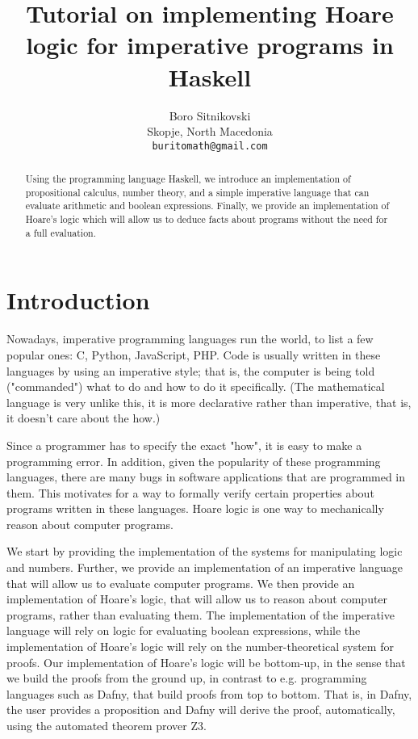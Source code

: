 \documentclass{article}
\title{Tutorial on implementing Hoare logic for imperative programs in Haskell}
\author{
  Boro Sitnikovski \\
  Skopje, North Macedonia \\
  \texttt{buritomath@gmail.com} \\
}
\begin{document}
\maketitle

\begin{abstract}
Using the programming language Haskell, we introduce an implementation of propositional calculus, number theory, and a simple imperative language that can evaluate arithmetic and boolean expressions. Finally, we provide an implementation of Hoare's logic which will allow us to deduce facts about programs without the need for a full evaluation.
\end{abstract}


\section{Introduction}

Nowadays, imperative programming languages run the world, to list a few popular ones: C, Python, JavaScript, PHP. Code is usually written in these languages by using an imperative style; that is, the computer is being told ("commanded") what to do and how to do it specifically. (The mathematical language is very unlike this, it is more declarative rather than imperative, that is, it doesn't care about the how.)

Since a programmer has to specify the exact "how", it is easy to make a programming error. In addition, given the popularity of these programming languages, there are many bugs in software applications that are programmed in them. This motivates for a way to formally verify certain properties about programs written in these languages. Hoare logic is one way to mechanically reason about computer programs.

We start by providing the implementation of the systems for manipulating logic and numbers. Further, we provide an implementation of an imperative language that will allow us to evaluate computer programs. We then provide an implementation of Hoare's logic, that will allow us to reason about computer programs, rather than evaluating them. The implementation of the imperative language will rely on logic for evaluating boolean expressions, while the implementation of Hoare's logic will rely on the number-theoretical system for proofs. Our implementation of Hoare's logic will be bottom-up, in the sense that we build the proofs from the ground up, in contrast to e.g. programming languages such as Dafny\cite{b1}, that build proofs from top to bottom. That is, in Dafny, the user provides a proposition and Dafny will derive the proof, automatically, using the automated theorem prover Z3\cite{b2}.
\end{document}
